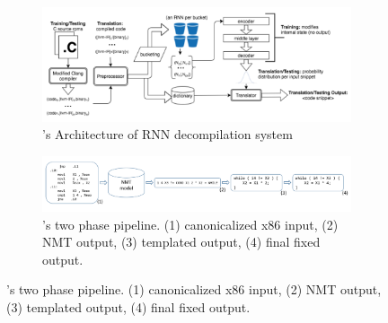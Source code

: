 \documentclass{article}
\begin{document}
\begin{figure}[ht]
\centering
\begin{subfigure}{\textwidth}
    \centering
    \includegraphics[width=\textwidth]{Images/decompilation_katz2018.png}
    \caption{\citet{katz2018using}'s Architecture of RNN decompilation system}
    \label{decompilation_katz2018}
\end{subfigure}
\hfill
\begin{subfigure}{\textwidth}
    \centering
    \includegraphics[width=\textwidth]{Images/decompilation_katz2019.png}
    \caption{\citet{katz2019towards}'s two phase pipeline. (1) canonicalized x86 input, (2) NMT output, (3) templated output, (4) final fixed output.}
    \label{decompilation_katz2019}
\end{subfigure}
\end{figure}
\end{document}
